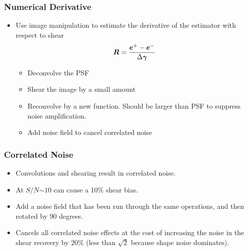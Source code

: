 \documentclass{beamer}
\newcommand{\mcalR}{\mbox{\boldmath $R$}}
\newcommand{\vecg}{\mbox{\boldmath $\gamma$}}
\newcommand{\vest}{\mbox{\boldmath $e$}}
\newcommand{\snr}{$S/N$}
\begin{document}
\frame
{
 
    \frametitle{Numerical Derivative}

       \begin{itemize}

        \item Use image manipulation to estimate the derivative of the
            estimator with respect to shear
            {\color{gold}
                \begin{equation}
                    \mcalR = \frac{\vest^+ - \vest^-}{\Delta \vecg} \nonumber 
                \end{equation}
            }
            \begin{itemize}
                \item Deconvolve the PSF
                \item Shear the image by a small amount
                \item Reconvolve by a new function.  Should be larger than PSF to suppress
                    noise amplification. 
                \item {\color{lightsteelblue} Add noise field to cancel correlated noise}
            \end{itemize}


    \end{itemize}

}

\frame
{
    \frametitle{Correlated Noise}

 

    \begin{itemize}

        \item Convolutions and shearing result in correlated noise.

        \item At \snr$\sim 10$ can cause a 10\% shear bias.

        \item Add a noise field that has been run through the same
            operations, and then rotated by 90 degrees.

        \item Cancels all correlated noise effects at the cost of
            increasing the noise in the shear recovery by 20\% (less
            than $\sqrt 2$ because shape noise dominates).

    \end{itemize}

}
\end{document}

